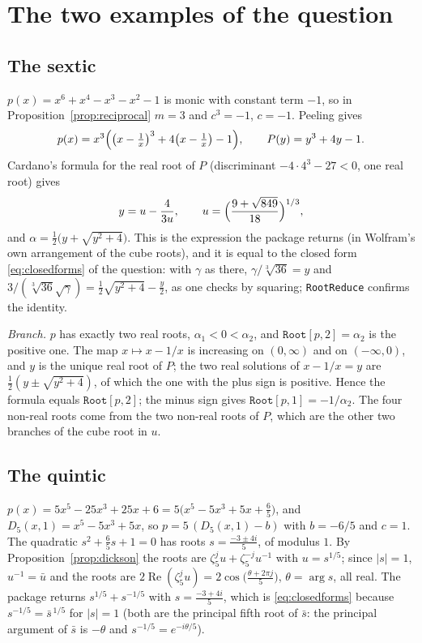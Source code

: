 \documentclass[11pt,a4paper]{article}
\theoremstyle{definition}
\theoremstyle{remark}
\newcommand{\code}[1]{\texttt{#1}}
\newcommand{\Root}{\code{Root}}
\begin{document}
\section{The two examples of the question}\label{sec:examples}

\subsection{The sextic}

$p(x)=x^6+x^4-x^3-x^2-1$ is monic with constant term $-1$, so in
Proposition~\ref{prop:reciprocal} $m=3$ and $c^3=-1$, $c=-1$.  Peeling gives
\[
p(x)=x^3\Bigl(\bigl(x-\tfrac1x\bigr)^3+4\bigl(x-\tfrac1x\bigr)-1\Bigr),
\qquad P(y)=y^3+4y-1 .
\]
Cardano's formula for the real root of $P$ (discriminant $-4\cdot4^3-27<0$, one real
root) gives
\[
y=u-\frac{4}{3u},\qquad u=\Bigl(\frac{9+\sqrt{849}}{18}\Bigr)^{1/3},
\]
and $\alpha=\tfrac12\bigl(y+\sqrt{y^2+4}\bigr)$.  This is the expression the package
returns (in Wolfram's own arrangement of the cube roots), and it is equal to the closed
form \eqref{eq:closedforms} of the question: with $\gamma$ as there,
$\gamma/\sqrt[3]{36}=y$ and $3/(\sqrt[3]{36}\sqrt{\gamma})=\tfrac12\sqrt{y^2+4}-\tfrac y2$,
as one checks by squaring; \code{RootReduce} confirms the identity.

\emph{Branch.}  $p$ has exactly two real roots, $\alpha_1<0<\alpha_2$, and
$\Root[p,2]=\alpha_2$ is the positive one.  The map $x\mapsto x-1/x$ is increasing on
$(0,\infty)$ and on $(-\infty,0)$, and $y$ is the unique real root of $P$; the two real
solutions of $x-1/x=y$ are $\tfrac12(y\pm\sqrt{y^2+4})$, of which the one with the plus
sign is positive.  Hence the formula equals $\Root[p,2]$; the minus sign gives
$\Root[p,1]=-1/\alpha_2$.  The four non-real roots come from the two non-real roots of
$P$, which are the other two branches of the cube root in $u$.

\subsection{The quintic}

$p(x)=5x^5-25x^3+25x+6=5\bigl(x^5-5x^3+5x+\tfrac65\bigr)$, and
$D_5(x,1)=x^5-5x^3+5x$, so $p=5\,(D_5(x,1)-b)$ with $b=-6/5$ and $c=1$.  The quadratic
$s^2+\tfrac65s+1=0$ has roots $s=\tfrac{-3\pm4i}{5}$, of modulus $1$.  By
Proposition~\ref{prop:dickson} the roots are $\zeta_5^ju+\zeta_5^{-j}u^{-1}$ with
$u=s^{1/5}$; since $|s|=1$, $u^{-1}=\bar u$ and the roots are $2\operatorname{Re}(\zeta_5^ju)=2\cos\bigl(\tfrac{\theta+2\pi j}{5}\bigr)$, $\theta=\arg s$, all
real.  The package returns $s^{1/5}+s^{-1/5}$ with $s=\tfrac{-3+4i}{5}$, which is
\eqref{eq:closedforms} because $s^{-1/5}=\bar s^{\,1/5}$ for $|s|=1$ (both are the
principal fifth root of $\bar s$: the principal argument of $\bar s$ is $-\theta$ and
$s^{-1/5}=e^{-i\theta/5}$).
\end{document}
